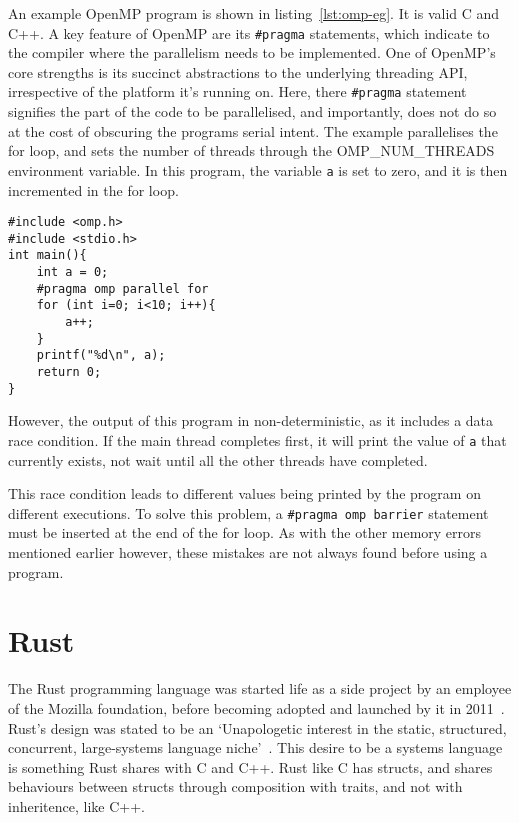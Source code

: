 An example OpenMP program is shown in listing~\ref{lst:omp-eg}. It is valid C and C++. A key feature of OpenMP are its \texttt{\#pragma} statements, which indicate to the compiler where the parallelism needs to be implemented.
One of OpenMP's core strengths is its succinct abstractions to the underlying threading API, irrespective of the platform it's running on. Here, there \texttt{\#pragma} statement signifies the part of the code to be parallelised, and importantly, does not do so at the cost of obscuring the programs serial intent.
The example parallelises the for loop, and sets the number of threads through the OMP\_NUM\_THREADS environment variable. In this program, the variable \texttt{a} is set to zero, and it is then incremented in the for loop.

\begin{code}
\begin{verbatim}
#include <omp.h>
#include <stdio.h>
int main(){
    int a = 0;
    #pragma omp parallel for
    for (int i=0; i<10; i++){
        a++;
    }
    printf("%d\n", a);
    return 0;
}
\end{verbatim}
\label{lst:omp-eg}
\end{code}

However, the output of this program in non-deterministic, as it includes a data race condition. If the main thread completes first, it will print the value of \texttt{a} that currently exists, not wait until all the other threads have completed. 

This race condition leads to different values being printed by the program on different executions. To solve this problem, a \texttt{\#pragma omp barrier} statement must be inserted at the end of the for loop. As with the other memory errors mentioned earlier however, these mistakes are not always found before using a program.

\section{Rust}
The Rust programming language was started life as a side project by an employee of the Mozilla foundation, before becoming adopted and launched by it in 2011~\cite{FutureTense}. Rust's design was stated to be an `Unapologetic interest in the static, structured, concurrent, large-systems language niche'~\cite{pServo}. This desire to be a systems language is something Rust shares with C and C++. Rust like C has structs, and shares behaviours between structs through composition with traits, and not with inheritence, like C++.

